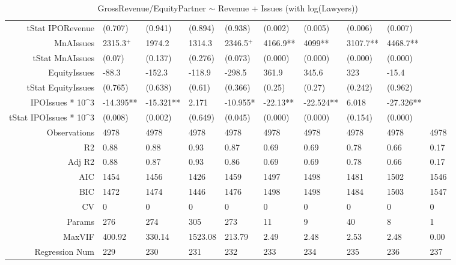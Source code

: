\begin{table}[ht]
\begin{tabular}{rlllllllll}
  tStat IPORevenue & (0.707) & (0.941) & (0.894) & (0.938) & (0.002) & (0.005) & (0.006) & (0.007) &  \\ 
  MnAIssues & 2315.3$^{+}$ & 1974.2 & 1314.3 & 2346.5$^{+}$ & 4166.9** & 4099** & 3107.7** & 4468.7** &  \\ 
  tStat MnAIssues & (0.07) & (0.137) & (0.276) & (0.073) & (0.000) & (0.000) & (0.000) & (0.000) &  \\ 
  EquityIssues & -88.3 & -152.3 & -118.9 & -298.5 & 361.9 & 345.6 & 323 & -15.4 &  \\ 
  tStat EquityIssues & (0.765) & (0.638) & (0.61) & (0.366) & (0.25) & (0.27) & (0.242) & (0.962) &  \\ 
  IPOIssues * 10^3 & -14.395** & -15.321** & 2.171 & -10.955* & -22.13** & -22.524** & 6.018 & -27.326** &  \\ 
  tStat IPOIssues * 10^3 & (0.008) & (0.002) & (0.649) & (0.045) & (0.000) & (0.000) & (0.154) & (0.000) &  \\ 
  Observations & 4978 & 4978 & 4978 & 4978 & 4978 & 4978 & 4978 & 4978 & 4978 \\ 
  R2 & 0.88 & 0.88 & 0.93 & 0.87 & 0.69 & 0.69 & 0.78 & 0.66 & 0.17 \\ 
  Adj R2 & 0.88 & 0.87 & 0.93 & 0.86 & 0.69 & 0.69 & 0.78 & 0.66 & 0.17 \\ 
  AIC & 1454 & 1456 & 1426 & 1459 & 1497 & 1498 & 1481 & 1502 & 1546 \\ 
  BIC & 1472 & 1474 & 1446 & 1476 & 1498 & 1498 & 1484 & 1503 & 1547 \\ 
  CV & 0 & 0 & 0 & 0 & 0 & 0 & 0 & 0 & 0 \\ 
  Params & 276 & 274 & 305 & 273 & 11 & 9 & 40 & 8 & 1 \\ 
  MaxVIF & 400.92 & 330.14 & 1523.08 & 213.79 & 2.49 & 2.48 & 2.53 & 2.48 & 0.00 \\ 
  Regression Num & 229 & 230 & 231 & 232 & 233 & 234 & 235 & 236 & 237 \\ 
   \hline
\end{tabular}
\caption{GrossRevenue/EquityPartner $\sim$ Revenue + Issues (with log(Lawyers))} 
\end{table}
